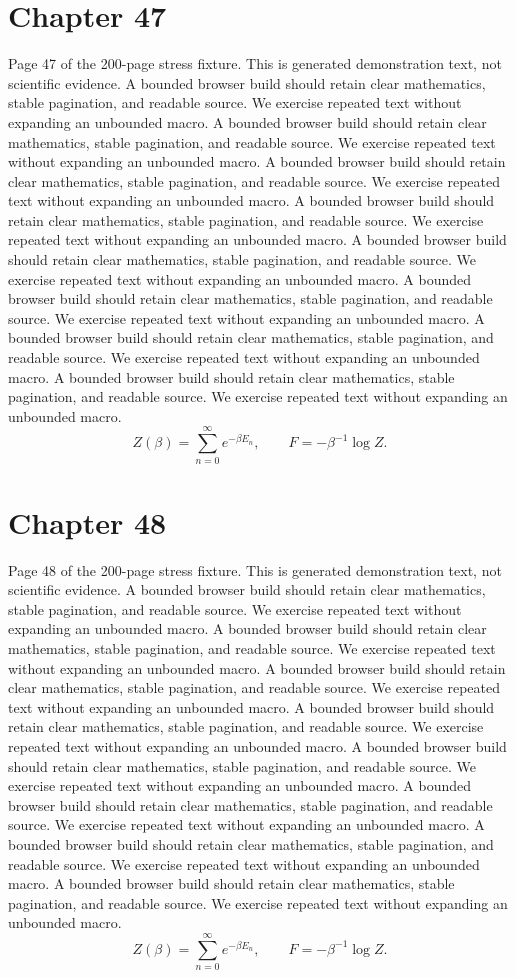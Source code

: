 \documentclass[11pt]{article}
\begin{document}
\section*{Chapter 47}
Page 47 of the 200-page stress fixture. This is generated demonstration text, not scientific evidence.
A bounded browser build should retain clear mathematics, stable pagination, and readable source. We exercise repeated text without expanding an unbounded macro.
A bounded browser build should retain clear mathematics, stable pagination, and readable source. We exercise repeated text without expanding an unbounded macro.
A bounded browser build should retain clear mathematics, stable pagination, and readable source. We exercise repeated text without expanding an unbounded macro.
A bounded browser build should retain clear mathematics, stable pagination, and readable source. We exercise repeated text without expanding an unbounded macro.
A bounded browser build should retain clear mathematics, stable pagination, and readable source. We exercise repeated text without expanding an unbounded macro.
A bounded browser build should retain clear mathematics, stable pagination, and readable source. We exercise repeated text without expanding an unbounded macro.
A bounded browser build should retain clear mathematics, stable pagination, and readable source. We exercise repeated text without expanding an unbounded macro.
A bounded browser build should retain clear mathematics, stable pagination, and readable source. We exercise repeated text without expanding an unbounded macro.
\[Z(\beta)=\sum_{n=0}^{\infty}e^{-\beta E_n},\qquad F=-\beta^{-1}\log Z.\]
\newpage
\section*{Chapter 48}
Page 48 of the 200-page stress fixture. This is generated demonstration text, not scientific evidence.
A bounded browser build should retain clear mathematics, stable pagination, and readable source. We exercise repeated text without expanding an unbounded macro.
A bounded browser build should retain clear mathematics, stable pagination, and readable source. We exercise repeated text without expanding an unbounded macro.
A bounded browser build should retain clear mathematics, stable pagination, and readable source. We exercise repeated text without expanding an unbounded macro.
A bounded browser build should retain clear mathematics, stable pagination, and readable source. We exercise repeated text without expanding an unbounded macro.
A bounded browser build should retain clear mathematics, stable pagination, and readable source. We exercise repeated text without expanding an unbounded macro.
A bounded browser build should retain clear mathematics, stable pagination, and readable source. We exercise repeated text without expanding an unbounded macro.
A bounded browser build should retain clear mathematics, stable pagination, and readable source. We exercise repeated text without expanding an unbounded macro.
A bounded browser build should retain clear mathematics, stable pagination, and readable source. We exercise repeated text without expanding an unbounded macro.
\[Z(\beta)=\sum_{n=0}^{\infty}e^{-\beta E_n},\qquad F=-\beta^{-1}\log Z.\]
\newpage
\end{document}
